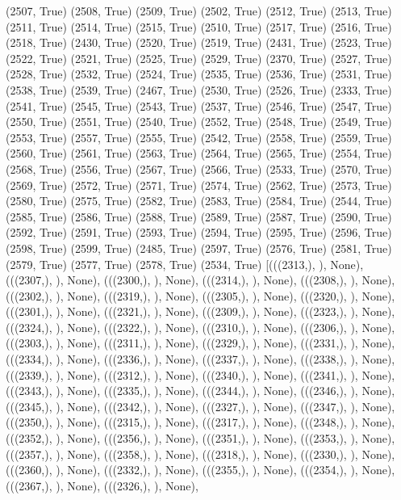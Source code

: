 (2507, True)
(2508, True)
(2509, True)
(2502, True)
(2512, True)
(2513, True)
(2511, True)
(2514, True)
(2515, True)
(2510, True)
(2517, True)
(2516, True)
(2518, True)
(2430, True)
(2520, True)
(2519, True)
(2431, True)
(2523, True)
(2522, True)
(2521, True)
(2525, True)
(2529, True)
(2370, True)
(2527, True)
(2528, True)
(2532, True)
(2524, True)
(2535, True)
(2536, True)
(2531, True)
(2538, True)
(2539, True)
(2467, True)
(2530, True)
(2526, True)
(2333, True)
(2541, True)
(2545, True)
(2543, True)
(2537, True)
(2546, True)
(2547, True)
(2550, True)
(2551, True)
(2540, True)
(2552, True)
(2548, True)
(2549, True)
(2553, True)
(2557, True)
(2555, True)
(2542, True)
(2558, True)
(2559, True)
(2560, True)
(2561, True)
(2563, True)
(2564, True)
(2565, True)
(2554, True)
(2568, True)
(2556, True)
(2567, True)
(2566, True)
(2533, True)
(2570, True)
(2569, True)
(2572, True)
(2571, True)
(2574, True)
(2562, True)
(2573, True)
(2580, True)
(2575, True)
(2582, True)
(2583, True)
(2584, True)
(2544, True)
(2585, True)
(2586, True)
(2588, True)
(2589, True)
(2587, True)
(2590, True)
(2592, True)
(2591, True)
(2593, True)
(2594, True)
(2595, True)
(2596, True)
(2598, True)
(2599, True)
(2485, True)
(2597, True)
(2576, True)
(2581, True)
(2579, True)
(2577, True)
(2578, True)
(2534, True)
[(((2313,), {}), None),
 (((2307,), {}), None),
 (((2300,), {}), None),
 (((2314,), {}), None),
 (((2308,), {}), None),
 (((2302,), {}), None),
 (((2319,), {}), None),
 (((2305,), {}), None),
 (((2320,), {}), None),
 (((2301,), {}), None),
 (((2321,), {}), None),
 (((2309,), {}), None),
 (((2323,), {}), None),
 (((2324,), {}), None),
 (((2322,), {}), None),
 (((2310,), {}), None),
 (((2306,), {}), None),
 (((2303,), {}), None),
 (((2311,), {}), None),
 (((2329,), {}), None),
 (((2331,), {}), None),
 (((2334,), {}), None),
 (((2336,), {}), None),
 (((2337,), {}), None),
 (((2338,), {}), None),
 (((2339,), {}), None),
 (((2312,), {}), None),
 (((2340,), {}), None),
 (((2341,), {}), None),
 (((2343,), {}), None),
 (((2335,), {}), None),
 (((2344,), {}), None),
 (((2346,), {}), None),
 (((2345,), {}), None),
 (((2342,), {}), None),
 (((2327,), {}), None),
 (((2347,), {}), None),
 (((2350,), {}), None),
 (((2315,), {}), None),
 (((2317,), {}), None),
 (((2348,), {}), None),
 (((2352,), {}), None),
 (((2356,), {}), None),
 (((2351,), {}), None),
 (((2353,), {}), None),
 (((2357,), {}), None),
 (((2358,), {}), None),
 (((2318,), {}), None),
 (((2330,), {}), None),
 (((2360,), {}), None),
 (((2332,), {}), None),
 (((2355,), {}), None),
 (((2354,), {}), None),
 (((2367,), {}), None),
 (((2326,), {}), None),
